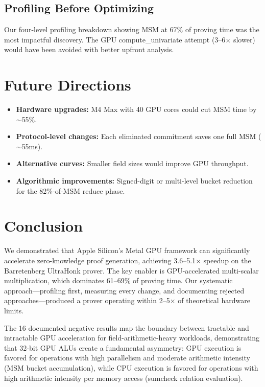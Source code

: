 \documentclass[11pt,a4paper]{article}
\begin{document}
\subsection{Profiling Before Optimizing}
Our four-level profiling breakdown showing MSM at 67\% of proving time was the most impactful discovery. The GPU compute\_univariate attempt (3--6$\times$ slower) would have been avoided with better upfront analysis.

\section{Future Directions}

\begin{itemize}
    \item \textbf{Hardware upgrades:} M4 Max with 40 GPU cores could cut MSM time by $\sim$55\%.
    \item \textbf{Protocol-level changes:} Each eliminated commitment saves one full MSM ($\sim$55ms).
    \item \textbf{Alternative curves:} Smaller field sizes would improve GPU throughput.
    \item \textbf{Algorithmic improvements:} Signed-digit or multi-level bucket reduction for the 82\%-of-MSM reduce phase.
\end{itemize}

\section{Conclusion}

We demonstrated that Apple Silicon's Metal GPU framework can significantly accelerate zero-knowledge proof generation, achieving 3.6--5.1$\times$ speedup on the Barretenberg UltraHonk prover. The key enabler is GPU-accelerated multi-scalar multiplication, which dominates 61--69\% of proving time. Our systematic approach---profiling first, measuring every change, and documenting rejected approaches---produced a prover operating within 2--5$\times$ of theoretical hardware limits.

The 16 documented negative results map the boundary between tractable and intractable GPU acceleration for field-arithmetic-heavy workloads, demonstrating that 32-bit GPU ALUs create a fundamental asymmetry: GPU execution is favored for operations with high parallelism and moderate arithmetic intensity (MSM bucket accumulation), while CPU execution is favored for operations with high arithmetic intensity per memory access (sumcheck relation evaluation).
\end{document}
